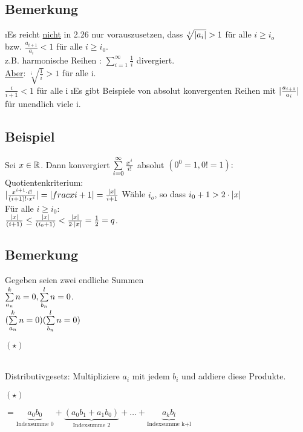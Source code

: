 \subsection{Bemerkung}
\begin{enumerate}[a)]
\i Es reicht \underline{nicht} in 2.26 nur vorauszusetzen, dass $\sqrt[i]{\abs{a_i}} > 1$ für alle $i \geq i_o$\\
bzw.  $\frac{a_{i+1}}{a_i} < 1$ für alle $i \geq i_0$.\\
z.B. harmonische Reihen : $\sum\limits_{i=1 }^{\infty} \frac{1}{i}$ divergiert.\\
\underline{Aber}: $\sqrt[i]{\frac{1}{i}} > 1$ für alle i.\\
\hspace*{30pt} $\frac{i}{i+1} < 1$ für alle i
\i Es gibt Beispiele von absolut konvergenten Reihen mit $\abs{\frac{a_{i+1}}{a_i}}$ für unendlich viele i.
\end{enumerate}
\subsection{Beispiel}
Sei $x \in \R$. Dann konvergiert $\seriesnull{\frac{x^i}{i!}}$ absolut $(0^0=1, 0! = 1):$\\
Quotientenkriterium:\\
$\abs{\frac{x^{i+1} \cd i!}{(i+1)! \cd x^i}} = \abs{frac{x}{i+1}} = \frac{\abs{x}}{i+1}$ Wähle $i_o$, so dass $i_0 + 1 > 2 \cd \abs{x}$\\
Für alle $i \geq i_0$:\\
$\frac{\abs{x}}{(i+1)} \leq \frac{\abs{x}}{(i_0+1)} < \frac{\abs{x}}{2 \cd \abs{x}} = \frac{1}{2} = q$.
\subsection{Bemerkung}
Gegeben seien zwei endliche Summen\\
$\seriesalg{n=0}{k}{a_n}, \seriesalg{n=0}{l}{b_n}$.\\
$(\seriesalg{n=0}{k}{a_n})(\seriesalg{n=0}{l}{b_n})$
\begin{huge}
$(\star)$
\end{huge}\\
Distributivgesetz: Multipliziere $a_i$ mit jedem $b_i$ und addiere diese Produkte.\\
\begin{huge}
$(\star)$
\end{huge}
$= \underbrace{a_0 b_0}_{\text{Indexsumme 0}} + \underbrace{(a_0b_1+ a_1b_0)}_{\text{Indexsumme 2}} + \ldots + \underbrace{a_kb_l}_{\text{Indexsumme k+l}}$
